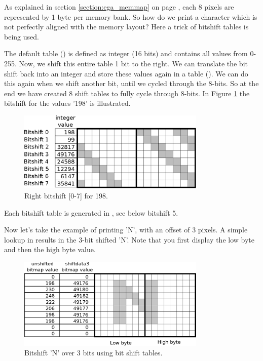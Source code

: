 \documentclass[book.tex]{subfiles}
\begin{document}
As explained in section \ref{section:ega_memmap} on page \pageref{section:ega_memmap}, each 8 pixels are represented by 1 byte per memory bank. So how do we print a character which is not perfectly aligned with the memory layout? Here a trick of bitshift tables is being used. \\
\par

The default table () is defined as integer (16 bits) and contains all values from 0-255. Now, we shift this entire table 1 bit to the right. We can translate the bit shift back into an integer and store these values again in a table (). We can do this again when we shift another bit, until we cycled through the 8-bits. So at the end we have created 8 shift tables to fully cycle through 8-bits. In Figure \ref{fig:shiftttable} the bitshift for the values '198' is illustrated.
\begin{figure}[H]
\centering
 \includegraphics[width=0.8\textwidth]{imgs/drawings/shift_tables.eps}
 \caption{Right bitshift [0-7] for 198.}
 \label{fig:shiftttable}
 \end{figure}
 \par

Each bitshift table is generated in , see below bitshift 5. \\
\begin{minipage}{\textwidth}
  
\end{minipage}
\label{wallclip_array}
\par
 

Now let's take the example of printing 'N', with an offset of 3 pixels. A simple lookup in  results in the 3-bit shifted 'N'. Note that you first display the low byte and then the high byte value. \\
\begin{figure}[H]
\centering
 \includegraphics[width=0.8\textwidth]{imgs/drawings/text_bitshift_N.eps}
 \caption{Bitshift 'N' over 3 bits using bit shift tables.}
 \label{fig:text_bitshift_N}
 \end{figure}
 \par
\end{document}
